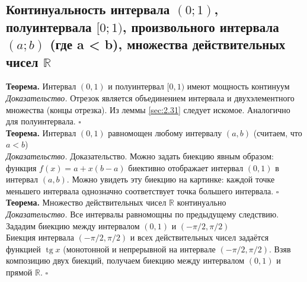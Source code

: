 \documentclass[a4paper]{article}
\newcommand{\qed}{\hfill$\square$}
\begin{document}
\subsection{Континуальность интервала $(0; 1)$, полуинтервала $[0; 1)$, произвольного интервала $(a; b)$ (где a < b), множества действительных чисел $\mathbb{R}$}
\textbf{Теорема.} Интервал $(0,1)$ и полуинтервал $[0,1)$ имеют мощность континуум\\[2mm]
\textit{Доказательство.} Отрезок является объединением интервала и двухэлементного множества (концы отрезка). Из леммы \ref{sec:2.31} следует искомое. Аналогично для полуинтервала. \qed\\[2mm]
\textbf{Теорема.} Интервал $(0,1)$ равномощен любому интервалу $(a, b)$ (считаем, что $a<b$)\\[2mm]
\textit{Доказательство.} Доказательство. Можно задать биекцию явным образом: функция $f(x)=a+x(b-a)$ биективно отображает интервал $(0,1)$ в интервал $(a, b)$. Можно увидеть эту биекцию на картинке: каждой точке меньшего интервала однозначно соответствует точка большего интервала. \qed\\[2mm]
\textbf{Теорема.} Множество действительных чисел $\mathbb{R}$ континуально\\[2mm]
\textit{Доказательство.} Все интервалы равномощны по предыдущему следствию. Зададим биекцию между интервалом $(0,1)$ и $(-\pi / 2, \pi / 2)$\\[2mm]
\indent Биекция интервала $(-\pi / 2, \pi / 2)$ и всех действительных чисел задаётся функцией $\operatorname{tg} x$ (монотонной и непрерывной на интервале $(-\pi / 2, \pi / 2)$. Взяв композицию двух биекций, получаем биекцию между интервалом $(0,1)$ и прямой $\mathbb{R}$. \qed
\end{document}
